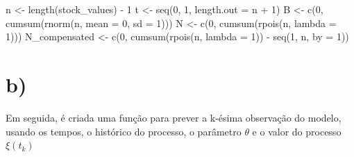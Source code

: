 \documentclass[
  letterpaper,
  DIV=11,
  numbers=noendperiod]{scrreprt}
\newenvironment{Shaded}{\begin{snugshade}}{\end{snugshade}}
\newcommand{\AttributeTok}[1]{\textcolor[rgb]{0.40,0.45,0.13}{#1}}
\newcommand{\DecValTok}[1]{\textcolor[rgb]{0.68,0.00,0.00}{#1}}
\newcommand{\FunctionTok}[1]{\textcolor[rgb]{0.28,0.35,0.67}{#1}}
\newcommand{\NormalTok}[1]{\textcolor[rgb]{0.00,0.23,0.31}{#1}}
\newcommand{\OtherTok}[1]{\textcolor[rgb]{0.00,0.23,0.31}{#1}}
\newcommand{\SpecialCharTok}[1]{\textcolor[rgb]{0.37,0.37,0.37}{#1}}
\begin{document}
\begin{Shaded}
\begin{Highlighting}[]
\NormalTok{n }\OtherTok{\textless{}{-}} \FunctionTok{length}\NormalTok{(stock\_values) }\SpecialCharTok{{-}} \DecValTok{1}
\NormalTok{t }\OtherTok{\textless{}{-}} \FunctionTok{seq}\NormalTok{(}\DecValTok{0}\NormalTok{, }\DecValTok{1}\NormalTok{, }\AttributeTok{length.out =}\NormalTok{ n }\SpecialCharTok{+} \DecValTok{1}\NormalTok{)}
\NormalTok{B }\OtherTok{\textless{}{-}} \FunctionTok{c}\NormalTok{(}\DecValTok{0}\NormalTok{, }\FunctionTok{cumsum}\NormalTok{(}\FunctionTok{rnorm}\NormalTok{(n, }\AttributeTok{mean =} \DecValTok{0}\NormalTok{, }\AttributeTok{sd =} \DecValTok{1}\NormalTok{)))}
\NormalTok{N }\OtherTok{\textless{}{-}} \FunctionTok{c}\NormalTok{(}\DecValTok{0}\NormalTok{, }\FunctionTok{cumsum}\NormalTok{(}\FunctionTok{rpois}\NormalTok{(n, }\AttributeTok{lambda =} \DecValTok{1}\NormalTok{)))}
\NormalTok{N\_compensated }\OtherTok{\textless{}{-}} \FunctionTok{c}\NormalTok{(}\DecValTok{0}\NormalTok{, }\FunctionTok{cumsum}\NormalTok{(}\FunctionTok{rpois}\NormalTok{(n, }\AttributeTok{lambda =} \DecValTok{1}\NormalTok{)) }\SpecialCharTok{{-}} \FunctionTok{seq}\NormalTok{(}\DecValTok{1}\NormalTok{, n, }\AttributeTok{by =} \DecValTok{1}\NormalTok{))}
\end{Highlighting}
\end{Shaded}

\hypertarget{b-1}{%
\section*{b)}\label{b-1}}


Em seguida, é criada uma função para prever a k-ésima observação do
modelo, usando os tempos, o histórico do processo, o parâmetro
\(\theta\) e o valor do processo \(\xi(t_{k})\)
\end{document}
